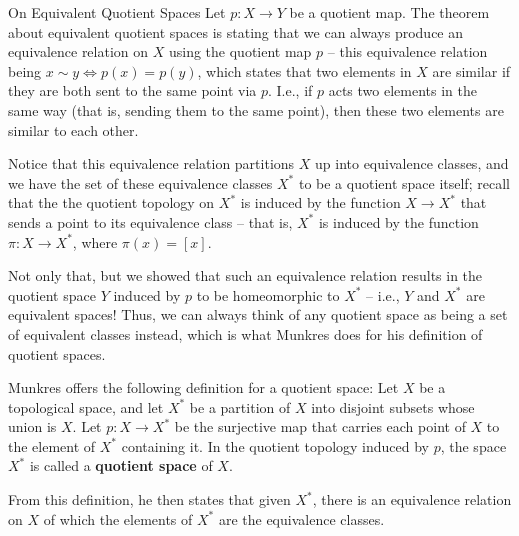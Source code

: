 \begin{remarkBox}{On Equivalent Quotient Spaces}
    Let \( p: X \rightarrow Y \) be a quotient map.
    The theorem about equivalent quotient spaces is stating that we can 
    always produce an equivalence 
    relation on \( X \) using the quotient map \( p \) -- this equivalence 
    relation being \( x \sim y \iff p ( x ) = p ( y ) \), which states that
    two elements in \( X \) are similar if they are both sent to the same point
    via \( p \).
    I.e., if \( p \) acts two elements in the same way (that is, sending them
    to the same point), then these two elements are similar to each other. 

    \baseSkip

    Notice that this equivalence relation partitions \( X \) up into equivalence
    classes, and we have the set of these equivalence classes \( X^{ * } \)
    to be a quotient space itself; recall that the the quotient topology on 
    \( X^{ * } \) is induced by the function \( X \rightarrow X^{ * } \) that 
    sends a point to its equivalence class -- 
    that is, \( X^{ * } \) is induced by the function \( \pi: X \rightarrow 
    X^{ * } \), where \( \pi ( x ) = [ x ] \).

    \baseSkip 

    Not only that, but we showed that such an equivalence relation 
    results in the quotient space \( Y \) induced by \( p \) to be homeomorphic
    to \( X^{ * } \) -- i.e., \( Y \) and \( X^{ * } \) are equivalent spaces!
    Thus, we can always think of any quotient space as being a set of 
    equivalent classes instead, which is what Munkres does for his definition 
    of quotient spaces.

    \baseRule 

    Munkres offers the following definition for a quotient space:
    Let \( X \) be a topological space, and let \( X^{ * } \) be a partition of
    \( X \) into disjoint subsets whose union is \( X \).
    Let \( p: X \rightarrow X^{ * } \) be the surjective map that carries each
    point of \( X \) to the element of \( X^{ * } \) containing it.
    In the quotient topology induced by \( p \), the space \( X^{ * } \) is 
    called a \textbf{quotient space} of \( X \).

    \baseSkip

    From this definition, he then states that given \( X^{ * } \), there is an
    equivalence relation on \( X \) of which the elements of \( X^{ * } \) are
    the equivalence classes.
\end{remarkBox}

